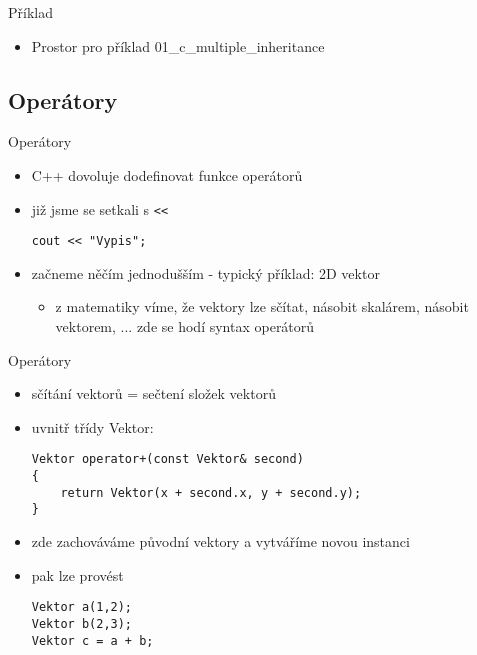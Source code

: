 \documentclass{beamer}
\begin{document}
\begin{xframe}{Příklad}
	\begin{itemize}
		\item Prostor pro příklad 01\_c\_multiple\_inheritance		
	\end{itemize}
\end{xframe}

\subsection{Operátory}

\begin{xframe}{Operátory}
	\begin{itemize}
		\item C++ dovoluje dodefinovat funkce operátorů
		\item již jsme se setkali s \texttt{<<}
\begin{lstlisting}[basicstyle=\fontsize{9}{10}\selectfont\ttfamily]
cout << "Vypis";
\end{lstlisting}
		\item začneme něčím jednodušším - typický příklad: 2D vektor
			\begin{itemize}
				\item z matematiky víme, že vektory lze sčítat, násobit skalárem, násobit vektorem, ... zde se hodí syntax operátorů
			\end{itemize}
	\end{itemize}
\end{xframe}

\begin{xframe}{Operátory}
	\begin{itemize}
		\item sčítání vektorů = sečtení složek vektorů
		\item uvnitř třídy Vektor:
\begin{lstlisting}[basicstyle=\fontsize{9}{10}\selectfont\ttfamily]
Vektor operator+(const Vektor& second)
{
    return Vektor(x + second.x, y + second.y);
}
\end{lstlisting}
		\item zde zachováváme původní vektory a vytváříme novou instanci
		\item pak lze provést
\begin{lstlisting}[basicstyle=\fontsize{9}{10}\selectfont\ttfamily]
Vektor a(1,2);
Vektor b(2,3);
Vektor c = a + b;
\end{lstlisting}
	\end{itemize}
\end{xframe}
\end{document}

